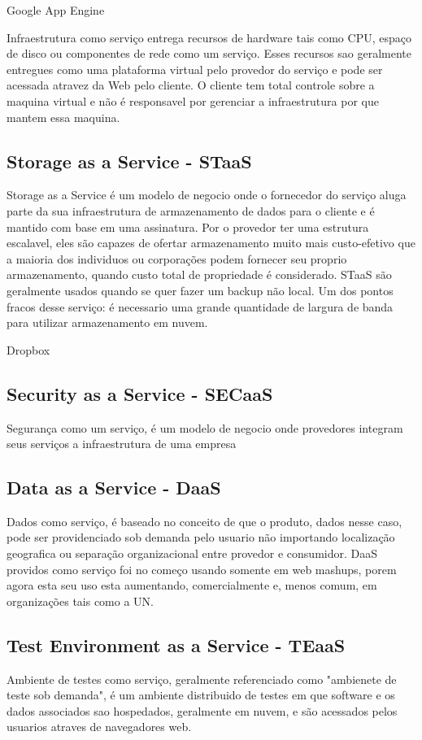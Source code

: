 	Google App Engine

	Infraestrutura como serviço entrega recursos de hardware tais como CPU, espaço de disco ou componentes de rede como um serviço. Esses recursos sao geralmente entregues como uma plataforma virtual pelo provedor do serviço e pode ser acessada atravez da Web pelo cliente. O cliente tem total controle sobre a maquina virtual e não é responsavel por gerenciar a infraestrutura por que mantem essa maquina.

\subsection{Storage as a Service - STaaS}
	Storage as a Service é um modelo de negocio onde o fornecedor do serviço aluga parte da sua infraestrutura de armazenamento de dados para o cliente e é mantido com base em uma assinatura. Por o provedor ter uma estrutura escalavel, eles são capazes de ofertar armazenamento muito mais custo-efetivo que a maioria dos individuos ou corporações podem fornecer seu proprio armazenamento, quando custo total de propriedade é considerado. STaaS são geralmente usados quando se quer fazer um backup não local. Um dos pontos fracos desse serviço: é necessario uma grande quantidade de largura de banda para utilizar armazenamento em nuvem.
	
	Dropbox
\subsection{Security as a Service - SECaaS}
	Segurança como um serviço, é um modelo de negocio onde provedores integram seus serviços a infraestrutura de uma empresa

\subsection{Data as a Service - DaaS}
	Dados como serviço, é baseado no conceito de que o produto, dados nesse caso, pode ser providenciado sob demanda pelo usuario não importando localização geografica ou separação organizacional entre provedor e consumidor. DaaS providos como serviço foi no começo usando somente em web mashups, porem agora esta seu uso esta aumentando, comercialmente e, menos comum, em organizações tais como a UN.

\subsection{Test Environment as a Service - TEaaS}
	Ambiente de testes como serviço, geralmente referenciado como "ambienete de teste sob demanda", é um ambiente distribuido de testes em que software e os dados associados sao hospedados, geralmente em nuvem, e são acessados pelos usuarios atraves de navegadores web.


